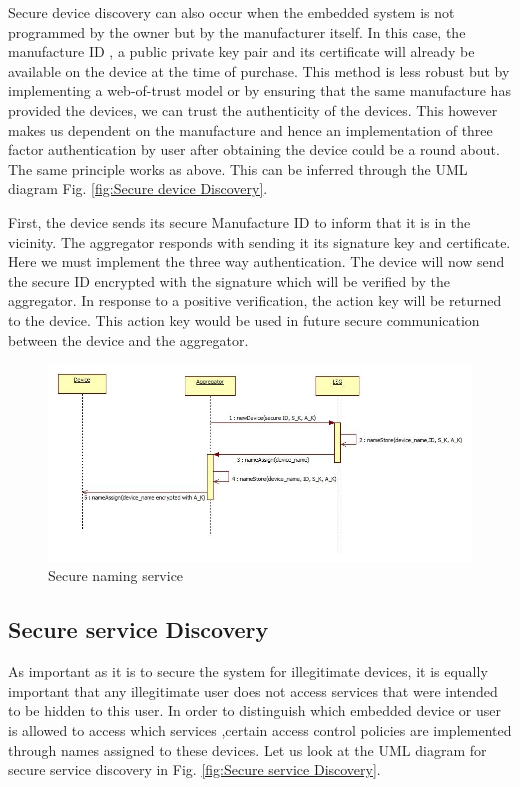 Secure device discovery can also occur when the embedded system is not programmed by the owner but by the manufacturer itself. In this case, the manufacture ID , a public private key pair and its certificate will already be available on the device at the time of purchase. This method is less robust but by implementing a web-of-trust model or by ensuring that the same manufacture has provided the devices, we can trust the authenticity of the devices. This however makes us dependent on the manufacture and hence an implementation of three factor authentication by user after obtaining the device could be a round about. The same principle works as above. This can be inferred through the UML diagram Fig. \ref{fig:Secure device Discovery}.\par



First, the device sends its secure Manufacture ID to inform that it is in the vicinity. The aggregator responds with sending it its signature key and certificate. Here we must implement the three way authentication. The device will now send the secure ID encrypted with the signature which will be verified by the aggregator. In response to a positive verification, the action key will be returned to the device. This action key would be used in future secure communication between the device and the aggregator.
 \begin{figure}[ht]
	\centering
	\includegraphics[width=\linewidth]{Figures/Secure-naming-service.jpg}
	\caption[]{Secure naming service}
	\label{fig:Secure naming service}
\end{figure}

\subsection{Secure service Discovery}
As important as it is to secure the system for illegitimate devices, it is equally important that any illegitimate user does not access services that were intended to be hidden to this user. In order to distinguish which embedded device or user is allowed to access which services ,certain access control policies are implemented through names assigned to these devices. Let us look at the UML diagram for secure service discovery in Fig. \ref{fig:Secure service Discovery}.\par

